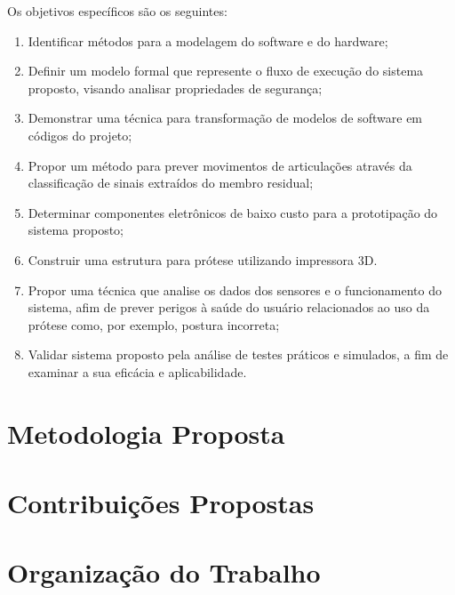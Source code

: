 Os objetivos específicos são os seguintes:
\begin{enumerate}
  \item Identificar métodos para a modelagem do software e do hardware;
  \item Definir um modelo formal que represente o fluxo de execução do sistema proposto, visando analisar propriedades de segurança;
  \item Demonstrar uma técnica para transformação de modelos de software em códigos do projeto;
  \item Propor um método para prever movimentos de articulações através da classificação de sinais extraídos do membro residual;
  \item Determinar componentes eletrônicos de baixo custo para a prototipação do sistema proposto;
  \item Construir uma estrutura para prótese utilizando impressora 3D.
  \item Propor uma técnica que analise os dados dos sensores e o funcionamento do sistema, afim de prever perigos à saúde do usuário relacionados ao uso da prótese como, por exemplo, postura incorreta;
  \item Validar sistema proposto pela análise de testes práticos e simulados, a fim de examinar a sua eficácia e aplicabilidade.
\end{enumerate}

\section{Metodologia Proposta}
\label{sec:metodologia}

\section{Contribuições Propostas}
\label{sec:contribuicoes}

\section{Organização do Trabalho}
\label{sec:organizacao}
